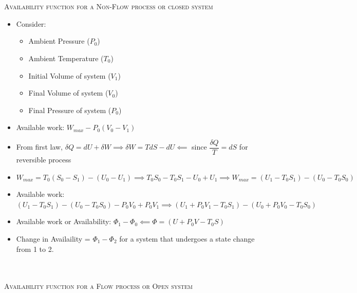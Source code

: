 \documentclass[8pt]{article}
\begin{document}
\\\\
\textsc{Availability function for a Non-Flow process or closed system}
	\begin{itemize}
		\item Consider: 
			\begin{itemize}
				\item Ambient Pressure ($P_0$)
				\item Ambient Temperature ($T_0$)
				\item Initial Volume of system ($V_1$)
				\item Final Volume of system ($V_0$)
				\item Final Pressure of system ($P_0$)
			\end{itemize}
		\item Available work: $W_{max} - P_0(V_0-V_1)$
		\item From first law, $\delta Q = dU + \delta W \implies \delta W = TdS - dU \impliedby$ since $\boxed{\dfrac{\delta Q}{T} = dS}$ for reversible process
		\item $W_{max} = T_0(S_0-S_1)-(U_0-U_1) \implies T_0S_0 - T_0S_1 - U_0 + U_1 \implies \boxed{W_{max}=(U_1-T_0S_1)-(U_0-T_0S_0)}$
		\item Available work: $(U_1-T_0S_1)-(U_0-T_0S_0)-P_0V_0+P_0V_1 \implies (U_1+P_0V_1-T_0S_1)-(U_0+P_0V_0-T_0S_0)$
		\item Available work or Availability: $\Phi_1-\Phi_0 \impliedby \boxed{\Phi=(U+P_0V-T_0S)}$
		\item Change in Availaility = $\Phi_1-\Phi_2$ for a system that undergoes a state change from 1 to 2. 
	\end{itemize}\hrulefill\\\\
\textsc{Availability function for a Flow process or Open system}
\end{document}
